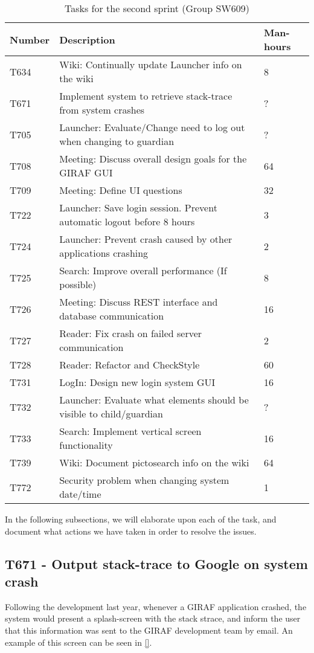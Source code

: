 \begin{table}[H]
\centering
\begin{tabular}{|l|l|l|}
\hline
Number	& Description & Man-hours												\\\hline
T634  	& Wiki: Continually update Launcher info on the wiki & 8\\\hline 
T671    & Implement system to retrieve stack-trace from system crashes & ?
\\\hline 
T705	& Launcher: Evaluate/Change need to log out when changing  to guardian
& ? \\\hline 
T708    & Meeting: Discuss overall design goals for the GIRAF GUI & 64\\\hline
T709	& Meeting: Define UI questions & 32 \\\hline 
T722   	& Launcher: Save login session. Prevent automatic logout before 8 hours
&3 \\\hline 
T724   	& Launcher: Prevent crash caused by other applications
crashing & 2 \\\hline 
T725  	& Search: Improve overall performance (If possible)	& 8 \\\hline 
T726    & Meeting: Discuss REST interface and database communication & 16
\\\hline 
T727    & Reader: Fix crash on failed server communication  & 2				\\\hline 
T728	& Reader: Refactor and CheckStyle  & 60\\\hline
T731    & LogIn: Design new login system GUI & 16     			\\\hline
T732    & Launcher: Evaluate what elements should be visible to
child/guardian & ?\\\hline 
T733    & Search: Implement vertical screen functionality & 16   			\\\hline 
T739    & Wiki: Document pictosearch info on the wiki & 64	\\\hline
T772    & Security problem when changing system date/time & 1 \\\hline
\end{tabular}
\caption{Tasks for the second sprint (Group SW609)} 
\label{SprintTwoTasks}    
\end{table} 

In the following subsections, we will elaborate upon each of the task, and
document what actions we have taken in order to resolve the issues.

\subsection{T671 - Output stack-trace to Google on system crash}
Following the development last year, whenever a GIRAF application crashed, the
system would present a splash-screen with the stack strace, and inform the user
that this information was sent to the GIRAF development team by email. An
example of this screen can be seen in \autoref{}.

